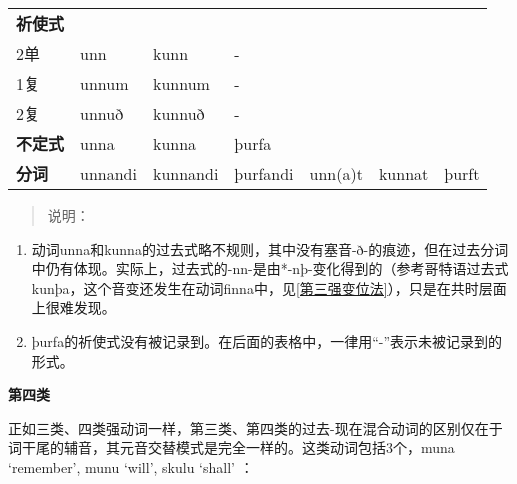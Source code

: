 \begin{longtable}{lllllll}
  \textbf{祈使式} & ~                        & ~                        & ~        & ~       & ~      & ~       \\
  2单             & unn                      & kunn                     & -        & ~       & ~      & ~       \\
  1复             & unnum                    & kunnum                   & -        & ~       & ~      & ~       \\
  2复             & unnuð                    & kunnuð                   & -        & ~       & ~      & ~       \\
  \textbf{不定式} & unna                     & kunna                    & þurfa    & ~       & ~      & ~       \\
  \textbf{分词}   & unnandi                  & kunnandi                 & þurfandi & unn(a)t & kunnat &
  þurft                                                                                                         \\
\end{longtable}

\begin{quote}
  说明：
\end{quote}

\begin{enumerate}
  \def\labelenumi{\arabic{enumi})}
  \item
        动词unna和kunna的过去式略不规则，其中没有塞音-ð-的痕迹，但在过去分词中仍有体现。实际上，过去式的-nn-是由*-nþ-变化得到的（参考哥特语过去式kunþa，这个音变还发生在动词finna中，见\ref{第三强变位法}），只是在共时层面上很难发现。
  \item
        þurfa的祈使式没有被记录到。在后面的表格中，一律用``-''表示未被记录到的形式。
\end{enumerate}

\textbf{第四类}

正如三类、四类强动词一样，第三类、第四类的过去-现在混合动词的区别仅在于词干尾的辅音，其元音交替模式是完全一样的。这类动词包括3个，muna
`remember‌', munu `will‌', skulu `shall‌' ：

